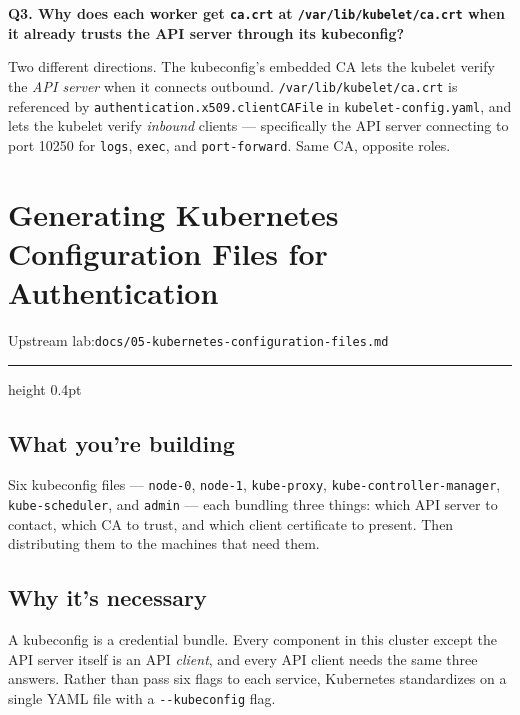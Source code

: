 \documentclass[11pt,oneside]{report}
\newcommand{\upstreamlab}[1]{%
  {\sffamily\footnotesize\color{steel}Upstream lab:\quad\texttt{#1}}\par\vspace{2pt}%
  {\color{rule}\hrule height 0.4pt}\vspace{8pt}}
\begin{document}
\textbf{Q3. Why does
each worker get
\texttt{ca.crt} at
\texttt{/}\allowbreak{}\texttt{var/}\allowbreak{}\texttt{lib/}\allowbreak{}\texttt{kubelet/}\allowbreak{}\texttt{ca.}\allowbreak{}\texttt{crt}
when it already
trusts the API
server through its
kubeconfig?}

Two different
directions. The
kubeconfig's
embedded CA lets the
kubelet verify the
\emph{API server}
when it connects
outbound.
\texttt{/}\allowbreak{}\texttt{var/}\allowbreak{}\texttt{lib/}\allowbreak{}\texttt{kubelet/}\allowbreak{}\texttt{ca.}\allowbreak{}\texttt{crt}
is referenced by
\texttt{authentication.}\allowbreak{}\texttt{x509.}\allowbreak{}\texttt{clientCAFile}
in
\texttt{kubelet-}\allowbreak{}\texttt{config.}\allowbreak{}\texttt{yaml},
and lets the kubelet
verify
\emph{inbound}
clients ---
specifically the API
server connecting to
port 10250 for
\texttt{logs},
\texttt{exec}, and
\texttt{port-forward}.
Same CA, opposite
roles.

\hypertarget{chap-5}{%
\chapter{Generating
Kubernetes
Configuration Files
for
Authentication}\label{chap-5}}

\upstreamlab{docs/05-kubernetes-configuration-files.md}

\hypertarget{what-youre-building-5}{%
\section{What you're
building}\label{what-youre-building-5}}

Six kubeconfig files
--- \texttt{node-0},
\texttt{node-1},
\texttt{kube-proxy},
\texttt{kube-}\allowbreak{}\texttt{controller-}\allowbreak{}\texttt{manager},
\texttt{kube-scheduler},
and \texttt{admin}
--- each bundling
three things: which
API server to
contact, which CA to
trust, and which
client certificate
to present. Then
distributing them to
the machines that
need them.

\hypertarget{why-its-necessary-5}{%
\section{Why it's
necessary}\label{why-its-necessary-5}}

\begin{whybox}

A kubeconfig is a
credential bundle.
Every component in
this cluster except
the API server
itself is an API
\emph{client}, and
every API client
needs the same three
answers. Rather than
pass six flags to
each service,
Kubernetes
standardizes on a
single YAML file
with a
\texttt{-\/-kubeconfig}
flag.

\end{whybox}
\end{document}
